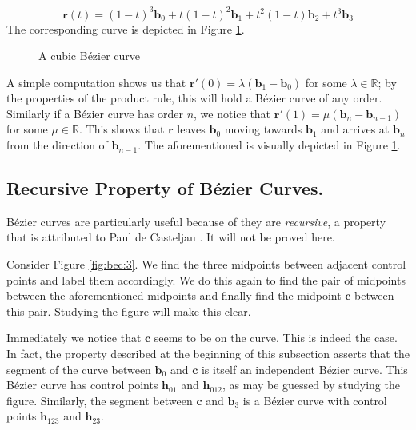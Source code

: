 \documentclass{article}
\begin{document}
\begin{equation}
  \label{eq:bec:3}
  \mathbf{r}(t) = (1-t)^3 \mathbf{b}_0 + t(1-t)^2 \mathbf{b}_1 + t^2(1-t) \mathbf{b}_2 + t^3 \mathbf{b}_3
\end{equation}
The corresponding curve is depicted in Figure \ref{fig:bec:2}.
\begin{figure}
  \centering
  \caption{A cubic B\'ezier curve}
  \label{fig:bec:2}
\end{figure}
\newpage
A simple computation shows us that $\mathbf{r} ' (0) = \lambda(\mathbf{b}_1 - \mathbf{b}_0)$ for some $\lambda \in \mathbb{R}$; by the properties of the product rule, this will hold a B\'ezier curve of any order.
Similarly if a B\'ezier curve has order $n$, we notice that $\mathbf{r} ' (1) = \mu (\mathbf{b}_n - \mathbf{b}_{n-1})$ for some $\mu \in \mathbb{R}$.
This shows that $\mathbf{r}$ leaves $\mathbf{b}_0$ moving towards $\mathbf{b}_1$ and arrives at $\mathbf{b}_n$ from the direction of $\mathbf{b}_{n-1}$.
The aforementioned is visually depicted in Figure \ref{fig:bec:2}.

\subsection{Recursive Property of B\'ezier Curves.}
\label{sec:bec:1}

B\'ezier curves are particularly useful because of they are \emph{recursive}, a property that is attributed to Paul de Casteljau \cite{casselman08}.
It will not be proved here.

Consider Figure \ref{fig:bec:3}.
We find the three midpoints between adjacent control points and label them accordingly.
We do this again to find the pair of midpoints between the aforementioned midpoints and finally find the midpoint $\mathbf{c}$ between this pair.
Studying the figure will make this clear.

Immediately we notice that $\mathbf{c}$ seems to be on the curve.
This is indeed the case.
In fact, the property described at the beginning of this subsection asserts that the segment of the curve between $\mathbf{b}_0$ and $\mathbf{c}$ is itself an independent B\'ezier curve.
This B\'ezier curve has control points $\mathbf{h}_{01}$ and $\mathbf{h}_{012}$, as may be guessed by studying the figure.
Similarly, the segment between $\mathbf{c}$ and $\mathbf{b}_3$ is a B\'ezier curve with control points $\mathbf{h}_{123}$ and $\mathbf{h}_{23}$.
\end{document}
